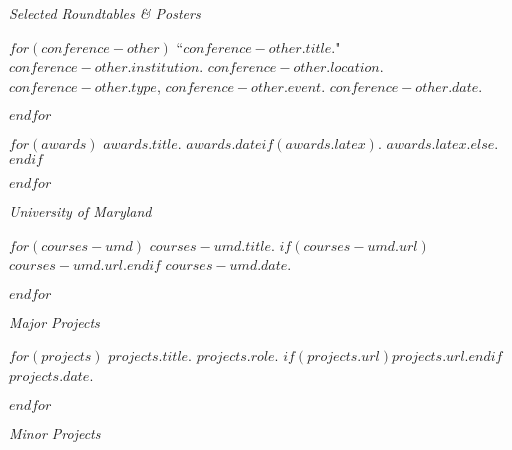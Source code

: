 \documentclass[11pt,article,oneside]{memoir}
\begin{document}
\pagebreak[1]
\ind \emph{Selected Roundtables \& Posters}

\smallskip

$for(conference-other)$
\ind ``$conference-other.title$." $conference-other.institution$. $conference-other.location$. $conference-other.type$, \emph{$conference-other.event$}. $conference-other.date$. \normalsize

\smallskip
$endfor$

\bigskip
\pagebreak[1]


$for(awards)$
\ind $awards.title$. $awards.date$$if(awards.latex)$. $awards.latex$.$else${.}$endif$
\smallskip

$endfor$

\bigskip
\pagebreak[1]


\ind \emph{University of Maryland}

\smallskip

$for(courses-umd)$
\ind $courses-umd.title$. $if(courses-umd.url)$\href{$courses-umd.url$}{$courses-umd.url$}.$endif$ $courses-umd.date$.

$endfor$
\smallskip
\medskip

%
%
%

%
%
%
%


\ind \emph{Major Projects}

\smallskip

$for(projects)$
\ind \emph{$projects.title$}. $projects.role$. $if(projects.url)$\href{$projects.url$}{$projects.url$}.$endif$ $projects.date$.

\smallskip
$endfor$

\medskip

\ind \emph{Minor Projects}
\end{document}
